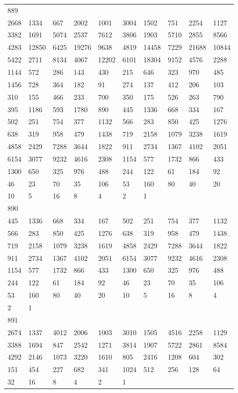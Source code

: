 \begin{longtable}{*{10}{l}}
889&&&&&&&&&\\
2668& 1334& 667& 2002& 1001& 3004& 1502& 751& 2254& 1127\\
3382& 1691& 5074& 2537& 7612& 3806& 1903& 5710& 2855& 8566\\
4283& 12850& 6425& 19276& 9638& 4819& 14458& 7229& 21688& 10844\\
5422& 2711& 8134& 4067& 12202& 6101& 18304& 9152& 4576& 2288\\
1144& 572& 286& 143& 430& 215& 646& 323& 970& 485\\
1456& 728& 364& 182& 91& 274& 137& 412& 206& 103\\
310& 155& 466& 233& 700& 350& 175& 526& 263& 790\\
395& 1186& 593& 1780& 890& 445& 1336& 668& 334& 167\\
502& 251& 754& 377& 1132& 566& 283& 850& 425& 1276\\
638& 319& 958& 479& 1438& 719& 2158& 1079& 3238& 1619\\
4858& 2429& 7288& 3644& 1822& 911& 2734& 1367& 4102& 2051\\
6154& 3077& 9232& 4616& 2308& 1154& 577& 1732& 866& 433\\
1300& 650& 325& 976& 488& 244& 122& 61& 184& 92\\
46& 23& 70& 35& 106& 53& 160& 80& 40& 20\\
10& 5& 16& 8& 4& 2& 1& \\

890&&&&&&&&&\\
445& 1336& 668& 334& 167& 502& 251& 754& 377& 1132\\
566& 283& 850& 425& 1276& 638& 319& 958& 479& 1438\\
719& 2158& 1079& 3238& 1619& 4858& 2429& 7288& 3644& 1822\\
911& 2734& 1367& 4102& 2051& 6154& 3077& 9232& 4616& 2308\\
1154& 577& 1732& 866& 433& 1300& 650& 325& 976& 488\\
244& 122& 61& 184& 92& 46& 23& 70& 35& 106\\
53& 160& 80& 40& 20& 10& 5& 16& 8& 4\\
2& 1& \\

891&&&&&&&&&\\
2674& 1337& 4012& 2006& 1003& 3010& 1505& 4516& 2258& 1129\\
3388& 1694& 847& 2542& 1271& 3814& 1907& 5722& 2861& 8584\\
4292& 2146& 1073& 3220& 1610& 805& 2416& 1208& 604& 302\\
151& 454& 227& 682& 341& 1024& 512& 256& 128& 64\\
32& 16& 8& 4& 2& 1& \\


\end{longtable}
